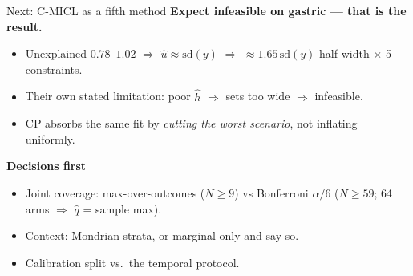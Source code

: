 \documentclass{beamer}
\begin{document}
\begin{frame}{Next: C-MICL as a fifth method}
  \small
  \textbf{Expect infeasible on gastric --- that is the result.}
  \begin{itemize}
    \item Unexplained $0.78$--$1.02$ $\Rightarrow$ $\hat u\approx\mathrm{sd}(y)$
      $\Rightarrow$ ${\approx}1.65\,\mathrm{sd}(y)$ half-width $\times$ 5
      constraints.
    \item Their own stated limitation: poor $\hat h$ $\Rightarrow$ sets too wide
      $\Rightarrow$ infeasible.
    \item CP absorbs the same fit by \emph{cutting the worst scenario}, not
      inflating uniformly.
  \end{itemize}
  \medskip
  \textbf{Decisions first}
  \begin{itemize}
    \item Joint coverage: max-over-outcomes ($N\ge9$) vs Bonferroni $\alpha/6$
      ($N\ge59$; 64 arms $\Rightarrow$ $\hat q$ = sample max).
    \item Context: Mondrian strata, or marginal-only and say so.
    \item Calibration split vs.\ the temporal protocol.
  \end{itemize}
\end{frame}
\end{document}
